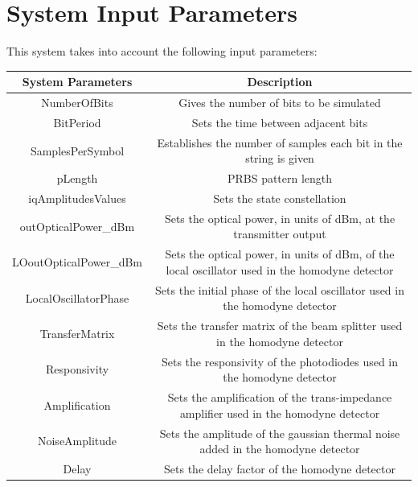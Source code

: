 \documentclass[a4paper]{article}
\begin{document}
\section{System Input Parameters}

This system takes into account the following input parameters:

\begin{savenotes}
\begin{table}[H]
\centering
\begin{tabulary}{1.0\textwidth}{|C|C|}
\hline
\textbf{System Parameters}      & \textbf{Description} 																 \\ \hline
NumberOfBits           & Gives the number of bits to be simulated		          										 \\ \hline  
BitPeriod              & Sets the time between adjacent bits                                                           \\ \hline 
SamplesPerSymbol       & Establishes the number of samples each bit in the string is given \footnotemark[1]	         \\ \hline
pLength                & PRBS pattern length					                      									 \\ \hline  
iqAmplitudesValues     & Sets the state constellation																	 \\ \hline  
outOpticalPower\_dBm   & Sets the optical power, in units of dBm, at the transmitter output							 \\ \hline  
LOoutOpticalPower\_dBm & Sets the optical power, in units of dBm, of the local oscillator used in the homodyne detector \\ \hline  
LocalOscillatorPhase   & Sets the initial phase of the local oscillator used in the homodyne detector					 \\ \hline  
TransferMatrix         & Sets the transfer matrix of the beam splitter used in the homodyne detector					 \\ \hline  
Responsivity           & Sets the responsivity of the photodiodes used in the homodyne detector						 \\ \hline  
Amplification          & Sets the amplification of the trans-impedance amplifier used in the homodyne detector			 \\ \hline  
NoiseAmplitude         & Sets the amplitude of the gaussian thermal noise added in the homodyne detector				 \\ \hline  
Delay                  & Sets the delay factor of the homodyne detector												 \\ \hline  

\end{tabulary}
\end{table}
\end{savenotes}
\end{document}
